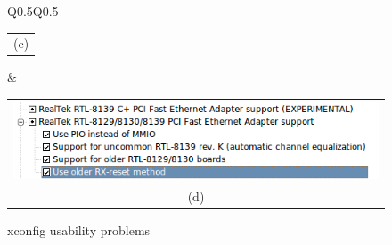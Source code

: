 \documentclass{chi2009}
\begin{document}
\begin{figure}[!t]
\begin{tabular}[textwidth]{Q{0.5\textwidth}Q{0.5\textwidth}}
\begin{tabular}{c}
  (c) \\
 \end{tabular}
  & 
\begin{tabular}{c}
  \includegraphics[scale=0.5,keepaspectratio=true]{figs/xconfigconfig} \\
  (d) \\
 \end{tabular}
\end{tabular}
\caption{\textsf{xconfig} usability problems}
\label{fig:xconfig}
\end{figure}
\end{document}
